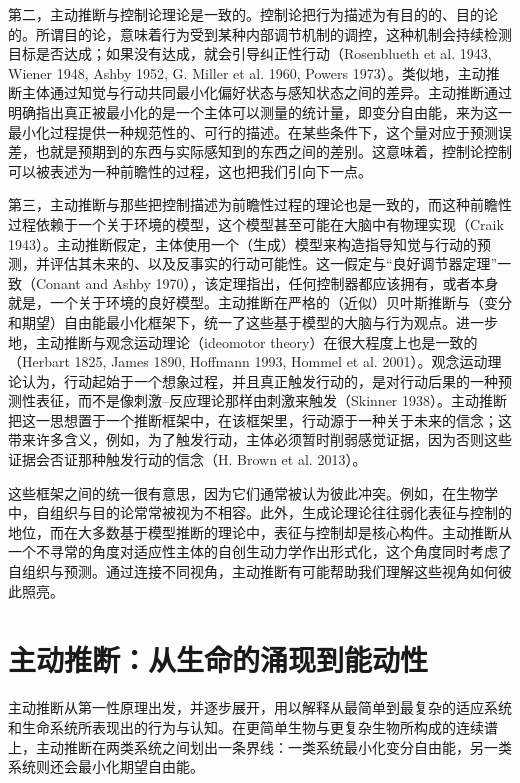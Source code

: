 第二，主动推断与控制论理论是一致的。控制论把行为描述为有目的的、目的论的。所谓目的论，意味着行为受到某种内部调节机制的调控，这种机制会持续检测目标是否达成；如果没有达成，就会引导纠正性行动（Rosenblueth et al. 1943, Wiener 1948, Ashby 1952, G. Miller et al. 1960, Powers 1973）。类似地，主动推断主体通过知觉与行动共同最小化偏好状态与感知状态之间的差异。主动推断通过明确指出真正被最小化的是一个主体可以测量的统计量，即变分自由能，来为这一最小化过程提供一种规范性的、可行的描述。在某些条件下，这个量对应于预测误差，也就是预期到的东西与实际感知到的东西之间的差别。这意味着，控制论控制可以被表述为一种前瞻性的过程，这也把我们引向下一点。

第三，主动推断与那些把控制描述为前瞻性过程的理论也是一致的，而这种前瞻性过程依赖于一个关于环境的模型，这个模型甚至可能在大脑中有物理实现（Craik 1943）。主动推断假定，主体使用一个（生成）模型来构造指导知觉与行动的预测，并评估其未来的、以及反事实的行动可能性。这一假定与“良好调节器定理”一致（Conant and Ashby 1970），该定理指出，任何控制器都应该拥有，或者本身就是，一个关于环境的良好模型。主动推断在严格的（近似）贝叶斯推断与（变分和期望）自由能最小化框架下，统一了这些基于模型的大脑与行为观点。进一步地，主动推断与观念运动理论（ideomotor theory）在很大程度上也是一致的（Herbart 1825, James 1890, Hoffmann 1993, Hommel et al. 2001）。观念运动理论认为，行动起始于一个想象过程，并且真正触发行动的，是对行动后果的一种预测性表征，而不是像刺激--反应理论那样由刺激来触发（Skinner 1938）。主动推断把这一思想置于一个推断框架中，在该框架里，行动源于一种关于未来的信念；这带来许多含义，例如，为了触发行动，主体必须暂时削弱感觉证据，因为否则这些证据会否证那种触发行动的信念（H. Brown et al. 2013）。

这些框架之间的统一很有意思，因为它们通常被认为彼此冲突。例如，在生物学中，自组织与目的论常常被视为不相容。此外，生成论理论往往弱化表征与控制的地位，而在大多数基于模型推断的理论中，表征与控制却是核心构件。主动推断从一个不寻常的角度对适应性主体的自创生动力学作出形式化，这个角度同时考虑了自组织与预测。通过连接不同视角，主动推断有可能帮助我们理解这些视角如何彼此照亮。

\section{主动推断：从生命的涌现到能动性}

主动推断从第一性原理出发，并逐步展开，用以解释从最简单到最复杂的适应系统和生命系统所表现出的行为与认知。在更简单生物与更复杂生物所构成的连续谱上，主动推断在两类系统之间划出一条界线：一类系统最小化变分自由能，另一类系统则还会最小化期望自由能。

